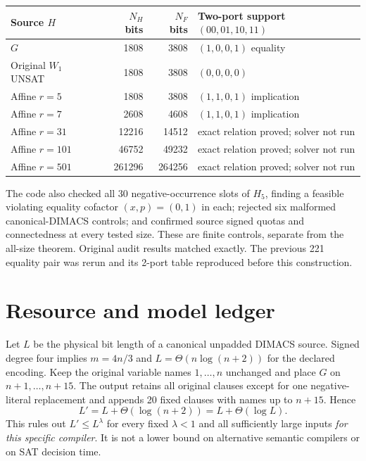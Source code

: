 \documentclass[11pt]{article}
\begin{document}
\begin{center}\small\begin{tabular}{lrrl}\toprule
Source $H$ & $N_H$ bits & $N_F$ bits & Two-port support $(00,01,10,11)$\\\midrule
$G$ &1808&3808& $(1,0,0,1)$ equality\\
Original $W_1$ UNSAT &1808&3808& $(0,0,0,0)$\\
Affine $r=5$ &1808&3808& $(1,1,0,1)$ implication\\
Affine $r=7$ &2608&4608& $(1,1,0,1)$ implication\\
Affine $r=31$ &12216&14512& exact relation proved; solver not run\\
Affine $r=101$ &46752&49232& exact relation proved; solver not run\\
Affine $r=501$ &261296&264256& exact relation proved; solver not run\\\bottomrule
\end{tabular}\end{center}
The code also checked all 30 negative-occurrence slots of $H_5$, finding a feasible violating equality cofactor $(x,p)=(0,1)$ in each; rejected six malformed canonical-DIMACS controls; and confirmed source signed quotas and connectedness at every tested size. These are finite controls, separate from the all-size theorem. Original audit results matched exactly. The previous 221 equality pair was rerun and its 2-port table reproduced before this construction.

\section{Resource and model ledger}
Let $L$ be the physical bit length of a canonical unpadded DIMACS source. Signed degree four implies $m=4n/3$ and $L=\Theta(n\log(n+2))$ for the declared encoding. Keep the original variable names $1,\ldots,n$ unchanged and place $G$ on $n+1,\ldots,n+15$. The output retains all original clauses except for one negative-literal replacement and appends 20 fixed clauses with names up to $n+15$. Hence
\[
 \boxed{L'=L+\Theta(\log(n+2))=L+\Theta(\log L).}
\]
This rules out $L'\le L^\lambda$ for every fixed $\lambda<1$ and all sufficiently large inputs \emph{for this specific compiler}. It is not a lower bound on alternative semantic compilers or on SAT decision time.
\end{document}
